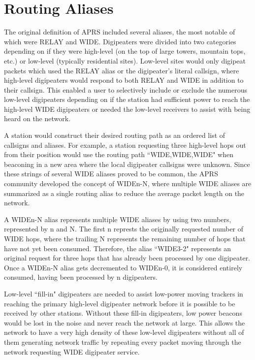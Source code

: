 \section{Routing Aliases}

The original definition of APRS included several aliases,
the most notable of which were RELAY and WIDE.
Digipeaters were divided into two categories depending on if they were high-level
(on the top of large towers, mountain tops, etc.)
or low-level (typically residential sites).
Low-level sites would only digipeat packets which used the RELAY alias
or the digipeater's literal callsign,
where high-level digipeaters would respond to both RELAY and WIDE in addition
to their callsign.
This enabled a user to selectively include or exclude the numerous low-level
digipeaters depending on if the station had sufficient power to
reach the high-level WIDE digipeaters or needed the low-level receivers
to assist with being heard on the network.

A station would construct their desired routing path as an ordered list
of callsigns and aliases.
For example, a station requesting three high-level hops out from their position
would use the routing path ``WIDE,WIDE,WIDE" when beaconing in a new area where
the local digipeater callsigns were unknown.
Since these strings of several WIDE aliases proved to be common,
the APRS community developed the concept of WIDEn-N, where multiple
WIDE aliases are summarized as a single routing alias to reduce the average
packet length on the network.

A WIDEn-N alias represents multiple WIDE aliases by using two numbers,
represented by n and N.
The first n represts the originally requested number of WIDE hops,
where the trailing N represents the remaining number of hops that have not yet
been consumed.
Therefore, the alias ``WIDE3-2" represents an original request for three hops
that has already been processed by one digipeater.
Once a WIDEn-N alias gets decremented to WIDEn-0, it is considered entirely
consumed, having been processed by n digipeaters.

Low-level ``fill-in" digipeaters are needed to assist low-power 
moving trackers in reaching the primary high-level digipeater network
before it is possible to be received by other stations.
Without these fill-in digipeaters, 
low power beacons would be lost in the noise and never reach the network at large.
This allows the network to have a very high density of these low-level
digipeaters without all of them generating network traffic by repeating every
packet moving through the network requesting WIDE digipeater service.

